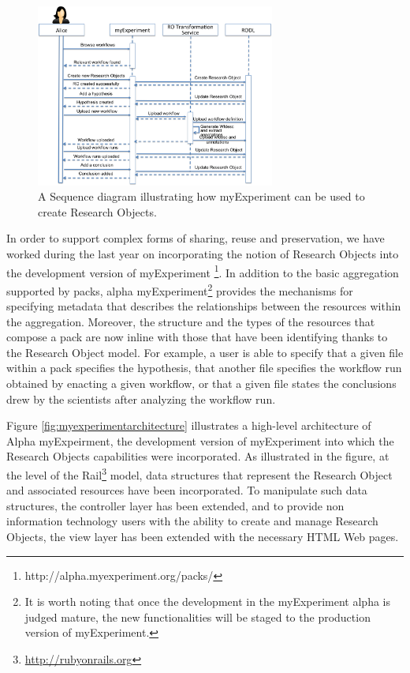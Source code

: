 \begin{figure}
\begin{center}
\includegraphics[width=0.7\textwidth]{Figures/myexperimentInteractions.png}
\end{center}
\caption{A Sequence diagram illustrating how myExperiment can be used to create Research Objects.}
\label{fig:myexperimentinteractions}
\end{figure} 
 
In order to support complex forms of sharing, reuse and preservation, we have worked during the last year on incorporating the notion of Research Objects into the development version of myExperiment \footnote{http://alpha.myexperiment.org/packs/}. In addition to the basic aggregation supported by packs, alpha myExperiment\footnote{It is worth noting that once the development in the myExperiment alpha is judged mature, the new functionalities will be staged to the production version of myExperiment.} provides the mechanisms for specifying metadata that describes the relationships between the resources within the aggregation. Moreover, the structure and the types of the resources that compose a pack are now inline with those that have been identifying thanks to the Research Object model. For example, a user is able to specify that a given file within a pack specifies the hypothesis, that another file specifies the workflow run obtained by enacting a given workflow, or that a given file states the conclusions drew by the scientists after analyzing the workflow run.


Figure \ref{fig:myexperimentarchitecture} illustrates a high-level architecture of Alpha myExpeirment, the development version of myExperiment into which the Research Objects capabilities were incorporated. As illustrated in the figure, at the level of the Rail\footnote{\url{http://rubyonrails.org}} model, data structures that represent the Research Object and associated resources have been incorporated. To manipulate such data structures, the controller layer has been extended, and to provide non information technology users with the ability to create and manage Research Objects, the view layer has been extended with the necessary HTML Web pages.



